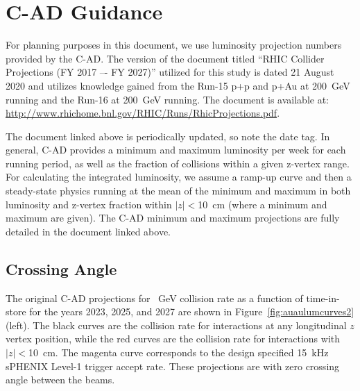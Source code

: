 \chapter{C-AD Guidance}
\label{chap:cad}

For planning purposes in this document, we use luminosity projection
numbers provided by the C-AD.  The version of the document titled
``RHIC Collider Projections (FY 2017 –- FY 2027)'' utilized for this
study is dated 21 August 2020 and utilizes knowledge gained from the
Run-15 p+p and p+Au at 200~GeV running and the Run-16 \auau at 200~GeV
running.  The document is available at:
\url{http://www.rhichome.bnl.gov/RHIC/Runs/RhicProjections.pdf}.

The document linked above is periodically updated, so note the date tag.  In general, C-AD provides a minimum and maximum luminosity per week for each running period, as well as the fraction of collisions within a given z-vertex range. For calculating the integrated luminosity, we assume a ramp-up curve and then a steady-state physics running at the mean of the minimum and maximum in both luminosity and z-vertex fraction within $|z|<$10~cm (where a minimum and maximum are given).  The C-AD minimum and maximum projections are fully detailed in the document linked above.

\section{Crossing Angle}

The original C-AD projections for ~GeV collision rate as a function of time-in-store for the years 2023, 2025, and 2027 are shown in Figure~\ref{fig:auaulumcurves2} (left).    The black curves are the collision rate for interactions at any longitudinal $z$ vertex position, while the red curves are the collision rate for interactions with $|z|<$10~cm.    The magenta curve corresponds to the design specified 15~kHz sPHENIX Level-1 trigger accept rate.
These projections are with zero crossing angle between the beams.   

